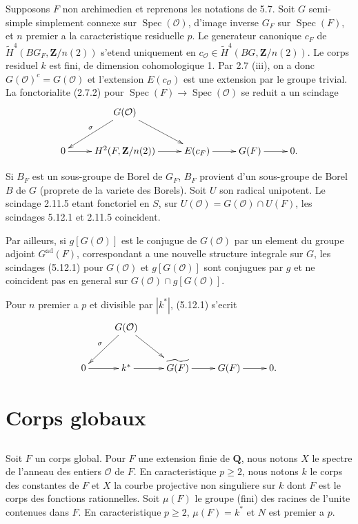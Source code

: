 \documentclass[11pt,a4paper]{article}
\theoremstyle{plain}
\theoremstyle{definition}
\DeclareMathOperator{\Spec}{Spec}
\DeclareMathOperator{\ad}{ad}
\begin{document}
Supposons $F$ non archimedien et reprenons les notations de 5.7. Soit $G$ semi-simple simplement connexe sur $\Spec(\mathcal{O})$, d'image inverse $G_F$ sur $\Spec(F)$, et $n$ premier a la caracteristique residuelle $p$. Le generateur canonique $c_F$ de $\widetilde{H}^4(BG_F, \mathbf{Z}/n(2))$ s'etend uniquement en $c_{\mathcal{O}} \in \widetilde{H}^4(BG, \mathbf{Z}/n(2))$. Le corps residuel $k$ est fini, de dimension cohomologique 1. Par 2.7 (iii), on a donc $G(\mathcal{O})^c = G(\mathcal{O})$ et l'extension $E(c_{\mathcal{O}})$ est une extension par le groupe trivial. La fonctorialite (2.7.2) pour $\Spec(F) \to \Spec(\mathcal{O})$ se reduit a un scindage
\[
\xymatrix{
& G(\mathcal{O}) \ar[dl]_{\sigma} \ar[dr] & \\
0 \ar[r] & H^2(F, \mathbf{Z}/n(2)) \ar[r] & E(c_F) \ar[r] & G(F) \ar[r] & 0.
}
\]

Si $B_F$ est un sous-groupe de Borel de $G_F$, $B_F$ provient d'un sous-groupe de Borel $B$ de $G$ (proprete de la variete des Borels). Soit $U$ son radical unipotent. Le scindage 2.11.5 etant fonctoriel en $S$, sur $U(\mathcal{O}) = G(\mathcal{O}) \cap U(F)$, les scindages 5.12.1 et 2.11.5 coincident.

Par ailleurs, si $g[G(\mathcal{O})]$ est le conjugue de $G(\mathcal{O})$ par un element du groupe adjoint $G^{\ad}(F)$, correspondant a une nouvelle structure integrale sur $G$, les scindages (5.12.1) pour $G(\mathcal{O})$ et $g[G(\mathcal{O})]$ sont conjugues par $g$ et ne coincident pas en general sur $G(\mathcal{O}) \cap g[G(\mathcal{O})]$.

Pour $n$ premier a $p$ et divisible par $|k^*|$, (5.12.1) s'ecrit
\[
\xymatrix{
& G(\mathcal{O}) \ar[dl]_{\sigma} \ar[dr] & \\
0 \ar[r] & k^* \ar[r] & \widetilde{G(F)} \ar[r] & G(F) \ar[r] & 0.
}
\]

\section{Corps globaux}

\subsection{}\label{6.1}

Soit $F$ un corps global. Pour $F$ une extension finie de $\mathbf{Q}$, nous notons $X$ le spectre de l'anneau des entiers $\mathcal{O}$ de $F$. En caracteristique $p \geq 2$, nous notons $k$ le corps des constantes de $F$ et $X$ la courbe projective non singuliere sur $k$ dont $F$ est le corps des fonctions rationnelles. Soit $\mu(F)$ le groupe (fini) des racines de l'unite contenues dans $F$. En caracteristique $p \geq 2$, $\mu(F) = k^*$ et $N$ est premier a $p$.
\end{document}
